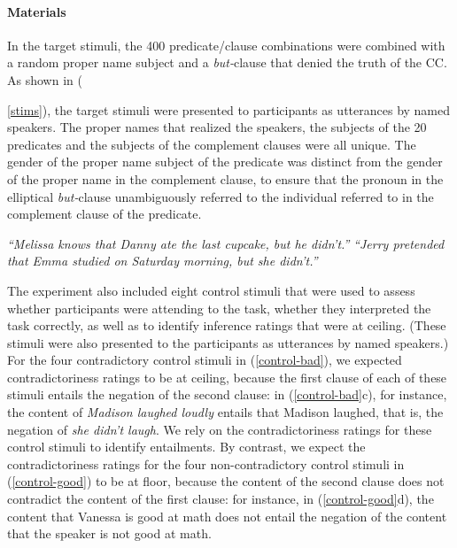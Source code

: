 \documentclass[11pt,fleqn]{article}
\newcommand{\6}{\mbox{$[\hspace*{-.6mm}[$}}
\newcommand{\9}{\mbox{$]\hspace*{-.6mm}]$}}
\begin{document}
\paragraph{Materials} In the target stimuli, the 400 predicate/clause combinations were combined with a random proper name subject and a {\em but-}clause that denied the truth of the CC. As shown in ({\ref{stims}), the target stimuli were presented to participants as utterances by named speakers. The proper names that realized the speakers, the subjects of the 20 predicates and the subjects of the complement clauses were all unique. The gender of the proper name subject of the predicate was distinct from the gender of the proper name in the complement clause, to ensure that the pronoun in the elliptical {\em but-}clause unambiguously referred to the individual referred to in the complement clause of the predicate.

\begin{exe}
\ex\label{stims}
\begin{xlist}
 {\em ``Melissa knows that Danny ate the last cupcake, but he didn't.''}
 {\em ``Jerry pretended that Emma studied on Saturday morning, but she didn't.''}
\end{xlist}
\end{exe}

The experiment also included eight control stimuli that were used to assess whether participants were attending to the task, whether they interpreted the task correctly, as well as to identify inference ratings that were at ceiling. (These stimuli were also presented to the participants as utterances by named speakers.) For the four contradictory control stimuli in (\ref{control-bad}), we expected contradictoriness ratings to be at ceiling, because the first clause of each of these stimuli entails the negation of the second clause: in (\ref{control-bad}c), for instance, the content of {\em Madison laughed loudly} entails that Madison laughed, that is, the negation of {\em she didn't laugh}. We rely on the contradictoriness ratings for these control stimuli to identify entailments. By contrast, we expect the contradictoriness ratings for the four non-contradictory control stimuli in (\ref{control-good}) to be at floor, because the content of the second clause does not contradict the content of the first clause: for instance, in (\ref{control-good}d), the content that Vanessa is good at math does not entail the negation of the content that the speaker is not good at math. 

}
\end{document}

